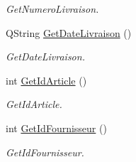 \begin{DoxyCompactItemize}
\begin{DoxyCompactList}\small\item\em Get\+Numero\+Livraison. \end{DoxyCompactList}\item 
Q\+String \mbox{\hyperlink{class_livraison_adc2aaa0aa7485d80d6471743b561aa32}{Get\+Date\+Livraison}} ()
\begin{DoxyCompactList}\small\item\em Get\+Date\+Livraison. \end{DoxyCompactList}\item 
int \mbox{\hyperlink{class_livraison_afd597ae5578dd4d035a1f0ebb6dab560}{Get\+Id\+Article}} ()
\begin{DoxyCompactList}\small\item\em Get\+Id\+Article. \end{DoxyCompactList}\item 
int \mbox{\hyperlink{class_livraison_abacc4cd612306dedfb785ff07f36617a}{Get\+Id\+Fournisseur}} ()
\begin{DoxyCompactList}\small\item\em Get\+Id\+Fournisseur. \end{DoxyCompactList}\end{DoxyCompactItemize}
